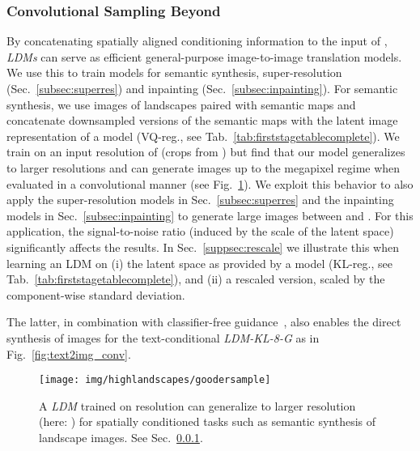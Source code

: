\documentclass[10pt,twocolumn,letterpaper]{article}
\newcommand{\thicksample}{
\begin{figure}[htbp]
\centering
\texttt{[image: img/highlandscapes/goodersample]}\vspace{-0.65em}
  \caption{\label{fig:thicksample} A \emph{LDM} trained on  resolution can generalize to 
  larger resolution (here: ) for spatially conditioned tasks
  such as semantic synthesis of landscape images. See
  Sec.~\ref{subsubsec:beyond}.\vspace{-1em}
  }
\end{figure}
}
\begin{document}
\vspace{-1.0em}
\subsubsection{Convolutional Sampling Beyond }
\label{subsubsec:beyond}
\vspace{-0.75em}
By concatenating spatially aligned conditioning information to the input of
, \emph{LDMs} can serve
as efficient general-purpose image-to-image translation models.
We use this to train models for semantic synthesis, super-resolution (Sec.~\ref{subsec:superres}) and inpainting (Sec.~\ref{subsec:inpainting}).
For semantic synthesis, we use images of landscapes paired with semantic maps \cite{spade, DBLP:journals/corr/abs-2012-09841}
and concatenate downsampled versions of the semantic maps with the latent image
representation of a  model (VQ-reg., see Tab.~\ref{tab:firststagetablecomplete}).
We train on an input resolution of  (crops from ) but find that our model generalizes to larger resolutions
and can
generate images up to the megapixel regime when evaluated in a convolutional
manner (see Fig.~\ref{fig:thicksample}).
We exploit this behavior to also apply the super-resolution models in
Sec.~\ref{subsec:superres} and the inpainting models in
Sec.~\ref{subsec:inpainting} to generate large images between  and .
For this application, the signal-to-noise ratio (induced by the scale of the latent space)
significantly affects the results.
In Sec.~\ref{suppsec:rescale} we illustrate this
when learning an LDM on (i) the latent space as provided by a  model (KL-reg., see Tab.~\ref{tab:firststagetablecomplete}),
and (ii) a rescaled version, scaled by the component-wise standard deviation. 

The latter, in combination with classifier-free guidance~\cite{ho2021classifier}, also enables the direct synthesis of 
 images for the text-conditional \emph{LDM-KL-8-G} as in Fig.~\ref{fig:text2img_conv}.

\thicksample
\vspace{-0.5em}
\end{document}
